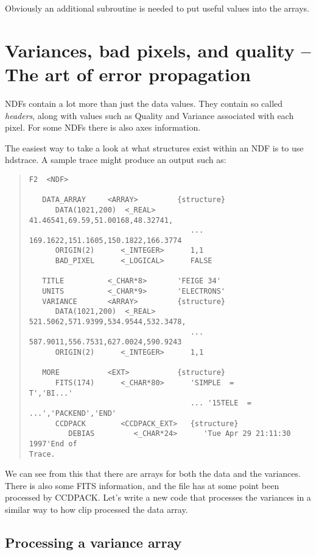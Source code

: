 Obviously an additional subroutine is needed to put useful values into
the arrays.

\section{Variances, bad pixels, and quality -- The art of error propagation}

NDFs contain a lot more than just the data values. They contain so called
{\em headers}, along with values such as Quality and Variance associated with
each pixel. For some NDFs there is also axes information.

The easiest way to take a look at what structures exist within an
NDF is to use {\sf hdstrace}.
A sample trace might produce an output such as:

\begin{quote}
{\small
\begin{verbatim}
F2  <NDF>

   DATA_ARRAY     <ARRAY>         {structure}
      DATA(1021,200)  <_REAL>        41.46541,69.59,51.00168,48.32741,
                                     ... 169.1622,151.1605,150.1822,166.3774
      ORIGIN(2)      <_INTEGER>      1,1
      BAD_PIXEL      <_LOGICAL>      FALSE

   TITLE          <_CHAR*8>       'FEIGE 34'
   UNITS          <_CHAR*9>       'ELECTRONS'
   VARIANCE       <ARRAY>         {structure}
      DATA(1021,200)  <_REAL>        521.5062,571.9399,534.9544,532.3478,
                                     ... 587.9011,556.7531,627.0024,590.9243
      ORIGIN(2)      <_INTEGER>      1,1

   MORE           <EXT>           {structure}
      FITS(174)      <_CHAR*80>      'SIMPLE  =                    T','BI...'
                                     ... '15TELE  =
...','PACKEND','END'
      CCDPACK        <CCDPACK_EXT>   {structure}
         DEBIAS         <_CHAR*24>      'Tue Apr 29 21:11:30 1997'End of
Trace.
\end{verbatim}
}
\end{quote}

We can see from this that there are arrays for both the data and the
variances. There is also some FITS information, and the file has at some
point been processed by CCDPACK. Let's write a new code that processes the
variances in a similar way to how clip processed the data array.

\subsection{Processing a variance array}

